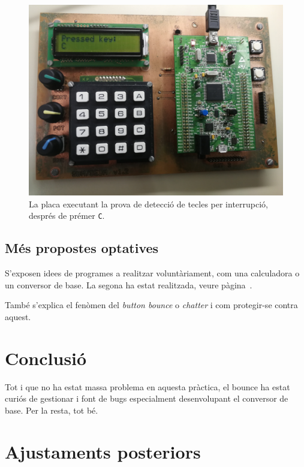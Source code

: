 \begin{figure}
  \begin{center}
    \includegraphics[width=1\columnwidth]{../photos/board/c1-intr}
  \end{center}
  \caption{ \label{fig:c1-board-intr} La placa executant la prova de detecció de tecles per interrupció, després de prémer \texttt{C}. }
\end{figure}


\subsection{Més propostes optatives}

S'exposen idees de programes a realitzar voluntàriament, com una calculadora o un conversor de base.
La segona ha estat realitzada, veure pàgina~\pageref{ch:basecvt}.

També s'explica el fenòmen del \emph{button bounce} o \emph{chatter} i com protegir-se contra aquest.


\section{Conclusió}

Tot i que no ha estat massa problema en aquesta pràctica, el bounce
ha estat curiós de gestionar i font de bugs especialment desenvolupant
el conversor de base. Per la resta, tot bé.

\section{Ajustaments posteriors}

